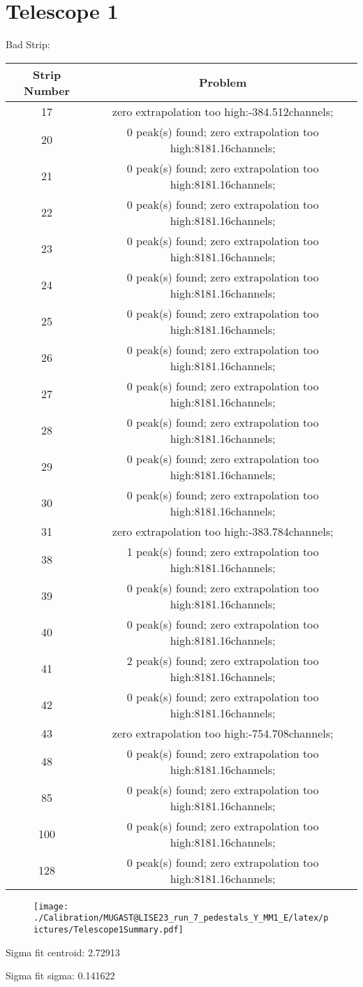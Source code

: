 \documentclass[a4paper,6pt]{article}
\begin{document}
\section{Telescope 1 }
 Bad Strip:
\begin{center}
\begin{tabular}{ | c | c | } 
\hline 
 Strip Number & Problem \\ \hline 
17 &  zero extrapolation too high:-384.512channels;  \\ \hline 
20 &  0 peak(s) found; zero extrapolation too high:8181.16channels;  \\ \hline 
21 &  0 peak(s) found; zero extrapolation too high:8181.16channels;  \\ \hline 
22 &  0 peak(s) found; zero extrapolation too high:8181.16channels;  \\ \hline 
23 &  0 peak(s) found; zero extrapolation too high:8181.16channels;  \\ \hline 
24 &  0 peak(s) found; zero extrapolation too high:8181.16channels;  \\ \hline 
25 &  0 peak(s) found; zero extrapolation too high:8181.16channels;  \\ \hline 
26 &  0 peak(s) found; zero extrapolation too high:8181.16channels;  \\ \hline 
27 &  0 peak(s) found; zero extrapolation too high:8181.16channels;  \\ \hline 
28 &  0 peak(s) found; zero extrapolation too high:8181.16channels;  \\ \hline 
29 &  0 peak(s) found; zero extrapolation too high:8181.16channels;  \\ \hline 
30 &  0 peak(s) found; zero extrapolation too high:8181.16channels;  \\ \hline 
31 &  zero extrapolation too high:-383.784channels;  \\ \hline 
38 &  1 peak(s) found; zero extrapolation too high:8181.16channels;  \\ \hline 
39 &  0 peak(s) found; zero extrapolation too high:8181.16channels;  \\ \hline 
40 &  0 peak(s) found; zero extrapolation too high:8181.16channels;  \\ \hline 
41 &  2 peak(s) found; zero extrapolation too high:8181.16channels;  \\ \hline 
42 &  0 peak(s) found; zero extrapolation too high:8181.16channels;  \\ \hline 
43 &  zero extrapolation too high:-754.708channels;  \\ \hline 
48 &  0 peak(s) found; zero extrapolation too high:8181.16channels;  \\ \hline 
85 &  0 peak(s) found; zero extrapolation too high:8181.16channels;  \\ \hline 
100 &  0 peak(s) found; zero extrapolation too high:8181.16channels;  \\ \hline 
128 &  0 peak(s) found; zero extrapolation too high:8181.16channels;  \\ \hline 
\end{tabular} 
\end{center}
\begin{figure}[htcb!]
\begin{center}
\texttt{[image: ./Calibration/MUGAST@LISE23\_run\_7\_pedestals\_Y\_MM1\_E/latex/pictures/Telescope1Summary.pdf]}
\end{center}
\end{figure}
\pagebreak
Sigma fit centroid: 2.72913

Sigma fit sigma: 0.141622
\end{document}
